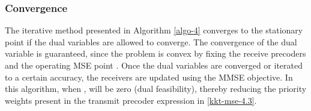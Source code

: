 \subsubsection*{Convergence}
The iterative method presented in Algorithm \ref{algo-4} converges to the stationary point if the dual variables  are allowed to converge. The convergence of the dual variable is guaranteed, since the problem is convex by fixing the receive precoders  and the operating \ac{MSE} point  \cite{boyd2011distributed}. Once the dual variables are converged or iterated to a certain accuracy, the receivers are updated using the \ac{MMSE} objective. In this algorithm, when ,  will be zero (dual feasibility), thereby reducing the priority weights  present in the transmit precoder expression in \eqref{kkt-mse-4.3}.
